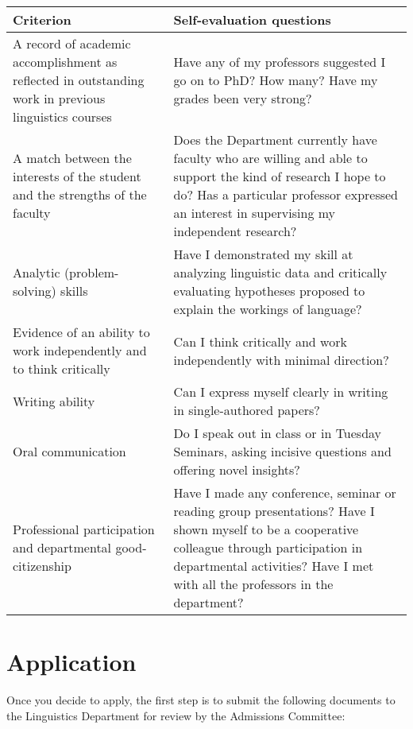 \documentclass[
]{book}
\begin{document}
\begin{longtable}[]{@{}
  >{\raggedright\arraybackslash}p{}
  >{\raggedright\arraybackslash}p{}@{}}
\toprule\noalign{}
\begin{minipage}[b]{\linewidth}\raggedright
Criterion
\end{minipage} & \begin{minipage}[b]{\linewidth}\raggedright
Self-evaluation questions
\end{minipage} \\
\midrule\noalign{}
\endhead
\bottomrule\noalign{}
\endlastfoot
A record of academic accomplishment as reflected in outstanding work in previous linguistics courses & Have any of my professors suggested I go on to PhD? How many? Have my grades been very strong? \\
A match between the interests of the student and the strengths of the faculty & Does the Department currently have faculty who are willing and able to support the kind of research I hope to do? Has a particular professor expressed an interest in supervising my independent research? \\
Analytic (problem-solving) skills & Have I demonstrated my skill at analyzing linguistic data and critically evaluating hypotheses proposed to explain the workings of language? \\
Evidence of an ability to work independently and to think critically & Can I think critically and work independently with minimal direction? \\
Writing ability & Can I express myself clearly in writing in single-authored papers? \\
Oral communication & Do I speak out in class or in Tuesday Seminars, asking incisive questions and offering novel insights? \\
Professional participation and departmental good-citizenship & Have I made any conference, seminar or reading group presentations? Have I shown myself to be a cooperative colleague through participation in departmental activities? Have I met with all the professors in the department? \\
\end{longtable}

\section{Application}\label{application}

Once you decide to apply, the first step is to submit the following documents to the Linguistics Department for review by the Admissions Committee:
\end{document}
